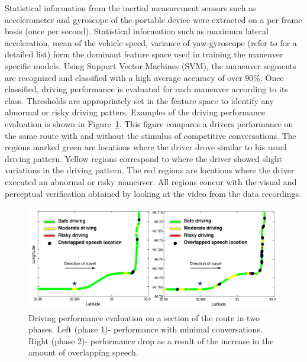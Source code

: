 Statistical information from the inertial measurement sensors such as accelerometer and gyroscope of the portable device were extracted on a per frame basis (once per second). 
Statistical information such as maximum lateral acceleration, mean of the vehicle speed, variance of yaw-gyroscope (refer to \cite{sathyanarayanaITSC2012} for a detailed list) form the dominant feature space used in training the maneuver specific models. 
Using Support Vector Machines (SVM), the maneuver segments are recognized and classified with a high average accuracy of over $90\%$. 
Once classified, driving performance is evaluated for each maneuver according to its class. 
Thresholds are appropriately set in the feature space to identify any abnormal or risky driving patters. 
Examples of the driving performance evaluation is shown in Figure~\ref{fig:ch6_driving_performance}. 
This figure compares a drivers performance on the same route with and without the stimulus of competitive conversations. 
The regions marked green are locations where the driver drove similar to his usual driving pattern. Yellow regions correspond to where the driver showed slight variations in the driving pattern. 
The red regions are locations where the driver executed an abnormal or risky maneuver. 
All regions concur with the visual and perceptual verification obtained by looking at the video from the data recordings. 

\begin{figure}[h!]
	\centering
	\includegraphics[scale=0.6]{figures/driving_and_overlap}
	\vspace{-5mm}
	\caption {Driving performance evaluation on a section of the route in two phases. Left (phase 1)-  performance with minimal conversations. Right (phase 2)- performance drop as a result of the increase in the amount of overlapping speech.}
	\label{fig:ch6_driving_performance}
	\vspace{-5mm}
\end{figure}


